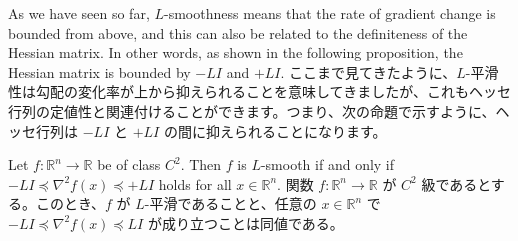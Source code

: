 \documentclass[0_main]{subfiles}
\begin{document}
\ifEn
    As we have seen so far, $L$-smoothness means that the rate of gradient change is bounded from above, and this can also be related to the definiteness of the Hessian matrix. In other words, as shown in the following proposition, the Hessian matrix is bounded by $-L I$ and $+L I$.
\else
    ここまで見てきたように、$L$-平滑性は勾配の変化率が上から抑えられることを意味してきましたが、これもヘッセ行列の定値性と関連付けることができます。つまり、次の命題で示すように、ヘッセ行列は $-L I$ と $+L I$ の間に抑えられることになります。
\fi
\begin{proposition}\label{prop:smoothness-hessian}
    \ifEn
        Let $f \colon \mathbb{R}^n \to \mathbb{R}$ be of class $C^2$. Then $f$ is $L$-smooth if and only if $-L I \preceq \nabla^2 f(x)\preceq +L I$ holds for all $x \in \mathbb{R}^n$.
    \else
        関数 $f \colon \mathbb{R}^n \to \mathbb{R}$ が $C^2$ 級であるとする。このとき、$f$ が $L$-平滑であることと、任意の $x \in \mathbb{R}^n$ で $-L I \preceq \nabla^2 f(x) \preceq L I$ が成り立つことは同値である。
    \fi
\end{proposition}
\end{document}
